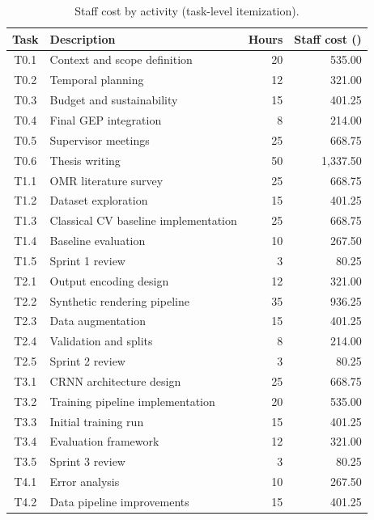 \documentclass[11pt, a4paper]{article}
\begin{document}
\begin{table}[h!]
    \centering
    \caption{Staff cost by activity (task-level itemization).}
    \label{tab:staff-task-cost}
    \renewcommand{\arraystretch}{1.04}
    \scriptsize
    \begin{tabularx}{\linewidth}{c >{\raggedright\arraybackslash}X r r}
        \toprule
        \textbf{Task} & \textbf{Description} & \textbf{Hours} & \textbf{Staff cost (\EUR{})} \\
        \midrule
        T0.1 & Context and scope definition & 20 & 535.00 \\
        T0.2 & Temporal planning & 12 & 321.00 \\
        T0.3 & Budget and sustainability & 15 & 401.25 \\
        T0.4 & Final GEP integration & 8 & 214.00 \\
        T0.5 & Supervisor meetings & 25 & 668.75 \\
        T0.6 & Thesis writing & 50 & 1,337.50 \\
        T1.1 & OMR literature survey & 25 & 668.75 \\
        T1.2 & Dataset exploration & 15 & 401.25 \\
        T1.3 & Classical CV baseline implementation & 25 & 668.75 \\
        T1.4 & Baseline evaluation & 10 & 267.50 \\
        T1.5 & Sprint 1 review & 3 & 80.25 \\
        T2.1 & Output encoding design & 12 & 321.00 \\
        T2.2 & Synthetic rendering pipeline & 35 & 936.25 \\
        T2.3 & Data augmentation & 15 & 401.25 \\
        T2.4 & Validation and splits & 8 & 214.00 \\
        T2.5 & Sprint 2 review & 3 & 80.25 \\
        T3.1 & CRNN architecture design & 25 & 668.75 \\
        T3.2 & Training pipeline implementation & 20 & 535.00 \\
        T3.3 & Initial training run & 15 & 401.25 \\
        T3.4 & Evaluation framework & 12 & 321.00 \\
        T3.5 & Sprint 3 review & 3 & 80.25 \\
        T4.1 & Error analysis & 10 & 267.50 \\
        T4.2 & Data pipeline improvements & 15 & 401.25 \\

\end{tabularx}
\end{table}
\end{document}

